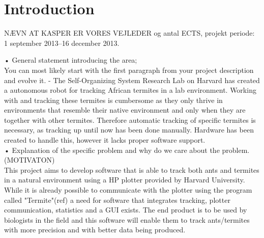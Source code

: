 
\section{Introduction}

% 
% 

NÆVN AT KASPER ER VORES VEJLEDER og antal ECTS, projekt periode: 1 september 2013--16 december 2013.

• General statement introducing the area; \\
You can most likely start with the first paragraph from your project description and evolve it. - The Self-Organizing System Research Lab on Harvard has created a autonomous robot for tracking African termites in a lab environment. Working with and tracking these termites is cumbersome as they only thrive in environments that resemble their native environment and only when they are together with other termites. Therefore automatic tracking of specific termites is necessary, as tracking up until now has been done manually. Hardware has been created to handle this, however it lacks proper software support. \\

• Explanation of the specific problem and why do we care about the problem. (MOTIVATON)\\
This project aims to develop software that is able to track both ants and termites in a natural environment using a HP plotter provided by Harvard University. While it is already possible to communicate with the plotter using the program called "Termite"(ref) a need for software that integrates tracking, plotter communication, statistics and a GUI exists. The end product is to be used by biologists in the field and this software will enable them to track ants/termites with more precision and with better data being produced.\\

